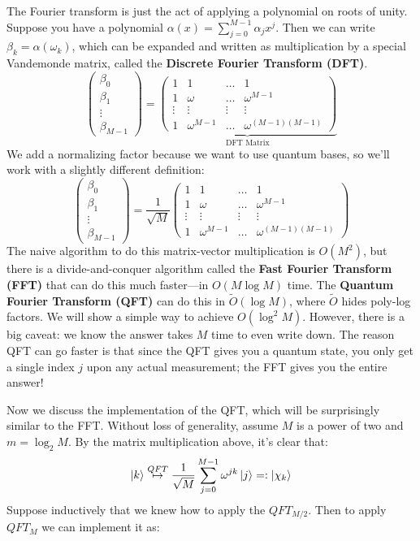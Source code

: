 The Fourier transform is just the act of applying a polynomial on roots of unity.
Suppose you have a polynomial $\alpha(x) = \sum_{j = 0}^{M - 1} \alpha_j x^j$. Then we can
write $\beta_k = \alpha(\omega_k)$, which can be expanded and written as multiplication
by a special Vandemonde matrix, called the \textbf{Discrete Fourier Transform (DFT)}.
\[ \begin{pmatrix}
    \beta_0 \\ \beta_1 \\ \vdots \\ \beta_{M - 1}
\end{pmatrix} = \underbrace{\begin{pmatrix}
    1 & 1 & \dots & 1 \\
    1 & \omega & \dots & \omega^{M - 1} \\
    \vdots & \vdots & \vdots & \vdots \\
    1 & \omega^{M - 1} & \dots & \omega^{(M - 1)(M - 1)}
\end{pmatrix}}_{\text{DFT Matrix}} \]
We add a normalizing factor because we want to 
use quantum bases, so we'll work with a slightly different definition:
\[ \begin{pmatrix}
    \beta_0 \\ \beta_1 \\ \vdots \\ \beta_{M - 1}
\end{pmatrix} = \frac{1}{\sqrt{M}} \begin{pmatrix}
    1 & 1 & \dots & 1 \\
    1 & \omega & \dots & \omega^{M - 1} \\
    \vdots & \vdots & \vdots & \vdots \\
    1 & \omega^{M - 1} & \dots & \omega^{(M - 1)(M - 1)}
\end{pmatrix} \]
The naive algorithm to do this matrix-vector multiplication is $O(M^2)$, but there is a
divide-and-conquer algorithm called the \textbf{Fast Fourier Transform (FFT)} that can do this much faster—in $O(M \log M)$ time.
The \textbf{Quantum Fourier Transform (QFT)} can do this in $\tilde{O}(\log M)$,
where $\tilde{O}$ hides poly-log factors. We will show a simple way to achieve $O(\log^2 M)$. However,
there is a big caveat: we know the answer takes $M$ time to even write down.
The reason QFT can go faster is that since the QFT gives you a quantum state,
you only get a single index $j$ upon any actual measurement; the FFT gives you the entire answer!

Now we discuss the implementation of the QFT, which will be surprisingly similar to the FFT. Without loss of generality,
assume $M$ is a power of two and $m = \log_2 M$. By the matrix multiplication above, it's clear that:
\[\ket{k} \overset{QFT}{\mapsto} \frac{1}{\sqrt{M}} \sum_{j = 0}^{M - 1} \omega^{jk} \ket{j} =: \ket{\chi_k} \]
Suppose inductively that we knew how to apply the $QFT_{M/2}$. Then to apply $QFT_M$ we can implement it as:

